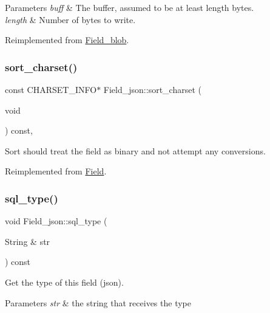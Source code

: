 \begin{DoxyParams}{Parameters}
{\em buff} & The buffer, assumed to be at least length bytes.\\
\hline
{\em length} & Number of bytes to write. \\
\hline
\end{DoxyParams}


Reimplemented from \mbox{\hyperlink{classField__blob_adfbed1cc92f6593bc9f5961cb138b5a8}{Field\+\_\+blob}}.

\mbox{\label{classField__json_a7a95dcafef3f774f2636f230996b0849}} 
\subsubsection{\texorpdfstring{sort\+\_\+charset()}{sort\_charset()}}
{\footnotesize\ttfamily const C\+H\+A\+R\+S\+E\+T\+\_\+\+I\+N\+FO$\ast$ Field\+\_\+json\+::sort\+\_\+charset (\begin{DoxyParamCaption}\item[{void}]{ }\end{DoxyParamCaption}) const\hspace{0.3cm}{\ttfamily [inline]}, {\ttfamily [virtual]}}

Sort should treat the field as binary and not attempt any conversions. 

Reimplemented from \mbox{\hyperlink{classField}{Field}}.

\mbox{\label{classField__json_acced64a853ec0146230e4152054a4b65}} 
\subsubsection{\texorpdfstring{sql\+\_\+type()}{sql\_type()}}
{\footnotesize\ttfamily void Field\+\_\+json\+::sql\+\_\+type (\begin{DoxyParamCaption}\item[{String \&}]{str }\end{DoxyParamCaption}) const\hspace{0.3cm}{\ttfamily [virtual]}}

Get the type of this field (json). 
\begin{DoxyParams}{Parameters}
{\em str} & the string that receives the type \\
\hline
\end{DoxyParams}


